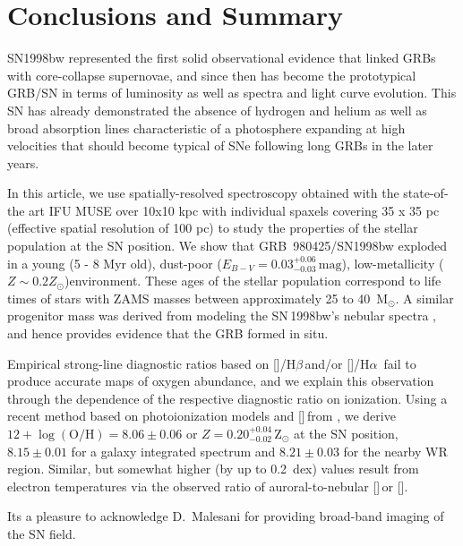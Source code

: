 \documentclass[traditabstract]{aa}
\newcommand{\hb}{H$\beta$}
\newcommand{\ha}{H$\alpha$}
\newcommand{\oh}{$12+\log(\mathrm{O/H})$}
\newcommand{\sii}{[\ion{S}{ii}]}
\newcommand{\siii}{[\ion{S}{iii}]}
\newcommand{\oiii}{[\ion{O}{iii}]}
\newcommand{\nii}{[\ion{N}{ii}]}
\begin{document}
\section{Conclusions and Summary}

SN1998bw represented the first solid observational evidence that linked GRBs with core-collapse supernovae, and since then has become the prototypical GRB/SN in terms of luminosity as well as spectra and light curve evolution. This SN has already demonstrated the absence of hydrogen and helium as well as broad absorption lines characteristic of a photosphere expanding at high velocities that should become typical of SNe following long GRBs in the later years.

In this article, we use spatially-resolved spectroscopy obtained with the state-of-the art IFU MUSE over 10x10 kpc with individual spaxels covering 35 x 35 pc (effective spatial resolution of 100 pc) to study the properties of the stellar population at the SN position. We show that GRB~980425/SN1998bw exploded in a young (5 - 8 Myr old), dust-poor ($E_{B-V} = 0.03_{-0.03}^{+0.06}\,\mathrm{mag}$), low-metallicity ($Z\sim0.2Z_{\odot}$)environment. These ages of the stellar population correspond to life times of stars with ZAMS masses between approximately 25 to 40~M$_{\odot}$. A similar progenitor mass was derived from modeling the SN\,1998bw's nebular spectra \citep{2006ApJ...640..854M}, and hence provides evidence that the GRB formed in situ.

Empirical strong-line diagnostic ratios based on \oiii/\hb\,and/or \nii/\ha\, fail to produce accurate maps of oxygen abundance, and we explain this observation through the dependence of the respective diagnostic ratio on ionization. Using a recent method based on photoionization models and \sii\,from \citet{2016Ap&SS.361...61D}, we derive \oh$=8.06\pm 0.06$ or $Z=0.20_{-0.02}^{+0.04}$\,Z$_{\odot}$ at the SN position, $8.15 \pm 0.01$ for a galaxy integrated spectrum and $8.21\pm 0.03$ for the nearby WR region. Similar, but somewhat higher (by up to 0.2~dex) values result from electron temperatures via the observed ratio of auroral-to-nebular \siii\,or \oiii.

\begin{acknowledgements}

Its a pleasure to acknowledge D.~Malesani for providing broad-band imaging of the SN field.

\end{acknowledgements}



\end{document}

